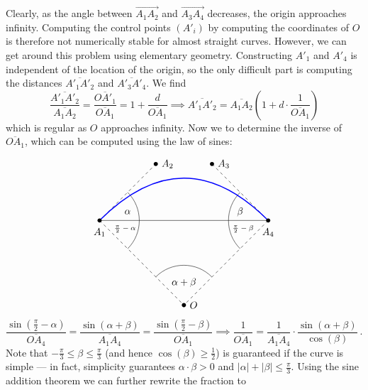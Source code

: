 \documentclass[12pt,a4paper]{article}
\theoremstyle{definition}
\begin{document}
Clearly, as the angle between $\overrightarrow{A_1A_2}$ and $\overrightarrow{A_3A_4}$ decreases, the origin approaches infinity. Computing the control points $(A'_i)$ by computing the coordinates of $O$ is therefore not numerically stable for almost straight curves. However, we can get around this problem using elementary geometry. Constructing $A'_1$ and $A'_4$ is independent of the location of the origin, so the only difficult part is computing the distances $\overline{A'_1A'_2}$ and $\overline{A'_3A'_4}$. We find
\begin{equation}
  \frac{\overline{A'_1A'_2}}{\overline{A_1A_2}} = \frac{\overline{OA'_1}}{\overline{OA_1}} = 1 + \frac{d}{\overline{OA_1}} \implies \overline{A'_1A'_2} = \overline{A_1A_2} \left(1 + d \cdot \frac{1}{\overline{OA_1}}\right)
\end{equation}
which is regular as $O$ approaches infinity. Now we to determine the inverse of $\overline{OA_1}$, which can be computed using the law of sines:
\[
\begin{tikzpicture}[every node/.append style={inner sep=1.5pt, circle, fill}]
  \coordinate (A1) at (-3, 0);
  \coordinate (A2) at (-1, 2);
  \coordinate (A3) at (1, 2);
  \coordinate (A4) at (3, 0);
  \coordinate (O) at (0, -3);
  \draw[dashed] (A1) -- (A2) (A3) -- (A4);
  \draw[dashed] (A1) -- (O) (A4) -- (O);
  \draw (A1) -- (A4);
  \draw (-2,-1) arc[start angle=-45, end angle=45, radius=1.41cm];
  \draw ( 2,-1) arc[start angle=180+45, end angle=180-45, radius=1.41cm];
  \draw (-1,-2) arc[start angle=180-45, end angle=45, radius=1.41cm];
  \draw[line width=1pt, blue] (A1) .. controls (A2) and (A3) .. (A4);
  \node[label={below:$A_1$}] at (A1) {};
  \node[label={right:$A_2$}] at (A2) {};
  \node[label={right:$A_3$}] at (A3) {};
  \node[label={below:$A_4$}] at (A4) {};
  \node[fill=none] at (-2,.3) {$\alpha$};
  \node[fill=none] at (-2.1,-.3) {\scriptsize$\frac{\pi}{2}-\alpha$};
  \node[fill=none] at ( 2,.3) {$\beta$};
  \node[fill=none] at ( 2.1,-.3) {\scriptsize$\frac{\pi}{2}-\beta$};
  \node[fill=none] at (0,-2.2) {$\alpha+\beta$};
  \node[label={right:$O$}] at (O) {};
\end{tikzpicture}
\]
\begin{equation}
  \frac{\sin(\tfrac{\pi}{2} - \alpha)}{\overline{OA_4}} = \frac{\sin(\alpha + \beta)}{\overline{A_1A_4}} = \frac{\sin(\tfrac{\pi}{2} - \beta)}{\overline{OA_1}} \implies \frac{1}{\overline{OA_1}} =  \frac{1}{\overline{A_1A_4}}\cdot\frac{\sin(\alpha + \beta)}{\cos(\beta)} \ .
\end{equation}
Note that $-\tfrac{\pi}{3} \leq \beta \leq \tfrac{\pi}{3}$ (and hence $\cos(\beta) \geq \tfrac{1}{2}$) is guaranteed if the curve is simple --- in fact, simplicity guarantees $\alpha \cdot \beta > 0$ and $|\alpha| + |\beta| \leq \tfrac{\pi}{3}$. Using the sine addition theorem we can further rewrite the fraction to
\end{document}
